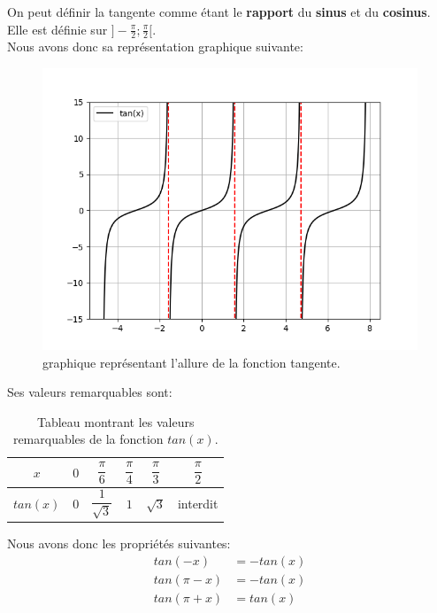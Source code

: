 \documentclass[12pt,a4paper,openany]{book}
\begin{document}
On peut définir la tangente comme étant le \textbf{rapport} du \textbf{sinus} et du \textbf{cosinus}. Elle est définie sur $ ]-\frac{\pi}{2}; \frac{\pi}{2}[ $.\\
Nous avons donc sa représentation graphique suivante:
\begin{figure}[!h]
\begin{center}
\includegraphics[scale=0.8]{Images/grapheTan.png} 
\caption{graphique représentant l'allure de la fonction tangente.}
\label{grapheTan}
\end{center}
\end{figure}

\newpage

Ses valeurs remarquables sont:
\begin{table}[!h]
\begin{center}
\begin{tabular}{|c|c|c|c|c|c|} %
\hline $ x $ & $ 0 $ & $ \dfrac{\pi}{6} $ & $ \dfrac{\pi}{4} $ & $ \dfrac{\pi}{3} $ & $ \dfrac{\pi}{2} $\\
\hline $ tan(x) $ & $ 0 $ & $ \dfrac{1}{\sqrt{3}} $ & $ 1 $ & $ \sqrt{3} $ & interdit\\
\hline
\end{tabular}
\caption{Tableau montrant les valeurs remarquables de la fonction $ tan(x) $.}
\label{tableauValeursTangente}
\end{center}
\end{table}

Nous avons donc les propriétés suivantes:
\begin{align}
tan(-x) & = -tan(x)\\
tan(\pi - x) & = -tan(x)\\
tan(\pi + x) & = tan(x)
\end{align}
\end{document}
